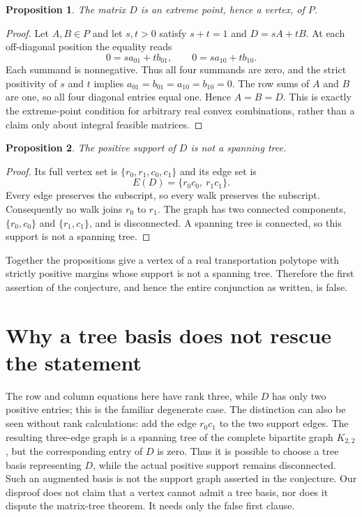 \documentclass[11pt]{article}
\newtheorem{proposition}{Proposition}
\begin{document}
\begin{proposition}
The matrix $D$ is an extreme point, hence a vertex, of $P$.
\end{proposition}
\begin{proof}
Let $A,B\in P$ and let $s,t>0$ satisfy $s+t=1$ and
$D=sA+tB$. At each off-diagonal position the equality reads
\[
 0=s a_{01}+t b_{01},\qquad
 0=s a_{10}+t b_{10}.
\]
Each summand is nonnegative. Thus all four summands are zero, and the strict positivity of $s$ and $t$ implies
$a_{01}=b_{01}=a_{10}=b_{10}=0$.
The row sums of $A$ and $B$ are one, so all four diagonal entries equal one. Hence $A=B=D$. This is exactly the extreme-point condition for arbitrary real convex combinations, rather than a claim only about integral feasible matrices.
\end{proof}

\begin{proposition}
The positive support of $D$ is not a spanning tree.
\end{proposition}
\begin{proof}
Its full vertex set is $\{r_0,r_1,c_0,c_1\}$ and its edge set is
\[
 E(D)=\{r_0c_0,\ r_1c_1\}.
\]
Every edge preserves the subscript, so every walk preserves the subscript. Consequently no walk joins $r_0$ to $r_1$. The graph has two connected components, $\{r_0,c_0\}$ and $\{r_1,c_1\}$, and is disconnected. A spanning tree is connected, so this support is not a spanning tree.
\end{proof}

Together the propositions give a vertex of a real transportation polytope with strictly positive margins whose support is not a spanning tree. Therefore the first assertion of the conjecture, and hence the entire conjunction as written, is false.

\section{Why a tree basis does not rescue the statement}
The row and column equations here have rank three, while $D$ has only two positive entries; this is the familiar degenerate case. The distinction can also be seen without rank calculations: add the edge $r_0c_1$ to the two support edges. The resulting three-edge graph is a spanning tree of the complete bipartite graph $K_{2,2}$, but the corresponding entry of $D$ is zero. Thus it is possible to choose a tree basis representing $D$, while the actual positive support remains disconnected. Such an augmented basis is not the support graph asserted in the conjecture. Our disproof does not claim that a vertex cannot admit a tree basis, nor does it dispute the matrix-tree theorem. It needs only the false first clause.
\end{document}
